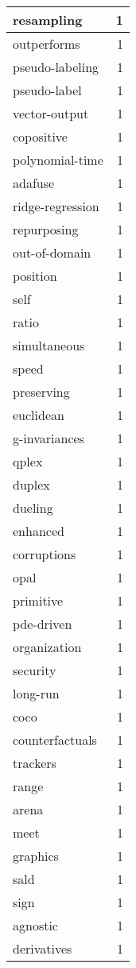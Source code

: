 \begin{table}[h]
\begin{tabular}{|l|r|}
\hline
resampling & 1 \\
\hline
outperforms & 1 \\
\hline
pseudo-labeling & 1 \\
\hline
pseudo-label & 1 \\
\hline
vector-output & 1 \\
\hline
copositive & 1 \\
\hline
polynomial-time & 1 \\
\hline
adafuse & 1 \\
\hline
ridge-regression & 1 \\
\hline
repurposing & 1 \\
\hline
out-of-domain & 1 \\
\hline
position & 1 \\
\hline
self & 1 \\
\hline
ratio & 1 \\
\hline
simultaneous & 1 \\
\hline
speed & 1 \\
\hline
preserving & 1 \\
\hline
euclidean & 1 \\
\hline
g-invariances & 1 \\
\hline
qplex & 1 \\
\hline
duplex & 1 \\
\hline
dueling & 1 \\
\hline
enhanced & 1 \\
\hline
corruptions & 1 \\
\hline
opal & 1 \\
\hline
primitive & 1 \\
\hline
pde-driven & 1 \\
\hline
organization & 1 \\
\hline
security & 1 \\
\hline
long-run & 1 \\
\hline
coco & 1 \\
\hline
counterfactuals & 1 \\
\hline
trackers & 1 \\
\hline
range & 1 \\
\hline
arena & 1 \\
\hline
meet & 1 \\
\hline
graphics & 1 \\
\hline
sald & 1 \\
\hline
sign & 1 \\
\hline
agnostic & 1 \\
\hline
derivatives & 1 \\

\end{tabular}
\end{table}
